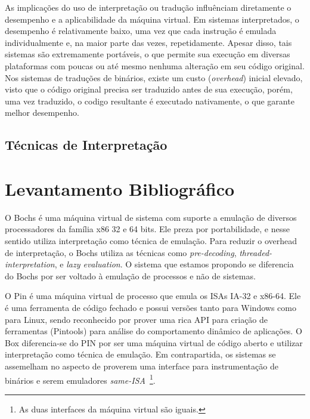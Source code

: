\documentclass[11pt,twoside]{article}
\begin{document}
As implicações do uso de interpretação ou tradução influênciam diretamente o desempenho e a aplicabilidade da máquina virtual.
Em sistemas interpretados, o desempenho é relativamente baixo, uma vez que cada instrução é emulada individualmente e, na maior parte das vezes, repetidamente.
Apesar disso, tais sistemas são extremamente portáveis, o que permite sua execução em diversas plataformas com poucas ou até mesmo nenhuma alteração em seu código original.
Nos sistemas de traduções de binários, existe um custo (\emph{overhead}) inicial elevado, visto que o código original precisa ser traduzido antes de sua execução, porém, uma vez traduzido, o codigo resultante é executado nativamente, o que garante melhor desempenho.

\subsection{Técnicas de Interpretação}

\section{Levantamento Bibliográfico}

O Bochs \cite{Lawton1996} é uma máquina virtual de sistema com suporte a emulação de diversos processadores da família x86 32 e 64 bits. 
Ele preza por portabilidade, e nesse sentido utiliza interpretação como técnica de emulação. Para reduzir o overhead de interpretação, o Bochs utiliza as técnicas como \emph{pre-decoding}\cite{Magnusson1994}, \emph{threaded-interpretation}\cite{Klint1981}, e \emph{lazy evaluation}\cite{Hookway1997}.
O sistema que estamos propondo se diferencia do Bochs por ser voltado à emulação de processos e não de sistemas.

O Pin \cite{Luk2005} é uma máquina virtual de processo que emula os ISAs IA-32 e x86-64. 
Ele é uma ferramenta de código fechado e possui versões tanto para Windows como para Linux, sendo reconhecido por prover uma rica API para criação de ferramentas (Pintools) para análise do comportamento dinâmico de aplicações. 
O Box diferencia-se do PIN por ser uma máquina virtual de código aberto e utilizar interpretação como técnica de emulação.
Em contrapartida, os sistemas se assemelham no aspecto de proverem uma interface para instrumentação de binários e serem emuladores \emph{same-ISA}~\footnote{As duas interfaces da máquina virtual são iguais.}.
\end{document}
